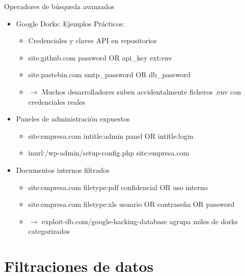 \documentclass[aspectratio=169,11pt]{beamer}
\begin{document}
\begin{frame}[allowframebreaks]{Operadores de búsqueda avanzados}
\small
  \begin{itemize}
  \item Google Dorks: Ejemplos Prácticos:
    \begin{itemize}

  \item Credenciales y claves API en repositorios
  \item site:github.com \textquotedbl{}password\textquotedbl{} OR \textquotedbl{}api\_key\textquotedbl{} ext:env
  \item site:pastebin.com \textquotedbl{}smtp\_password\textquotedbl{} OR \textquotedbl{}db\_password\textquotedbl{}
  \item $\rightarrow$ Muchos desarrolladores suben accidentalmente ficheros .env con credenciales reales
      \end{itemize}

  \item Paneles de administración expuestos
      \begin{itemize}

  \item site:empresa.com intitle:\textquotedbl{}admin panel\textquotedbl{} OR intitle:\textquotedbl{}login\textquotedbl{}
  \item inurl:\textquotedbl{}/wp-admin/setup-config.php\textquotedbl{} site:empresa.com
        \end{itemize}

  \item Documentos internos filtrados
        \begin{itemize}

  \item site:empresa.com filetype:pdf \textquotedbl{}confidencial\textquotedbl{} OR \textquotedbl{}uso interno\textquotedbl{}
  \item site:empresa.com filetype:xls \textquotedbl{}usuario\textquotedbl{} OR \textquotedbl{}contraseña\textquotedbl{} OR \textquotedbl{}password\textquotedbl{}
  \item $\rightarrow$ exploit-db.com/google-hacking-database agrupa miles de dorks categorizados
          \end{itemize}

  \end{itemize}
\end{frame}

\section{Filtraciones de datos}
\end{document}
